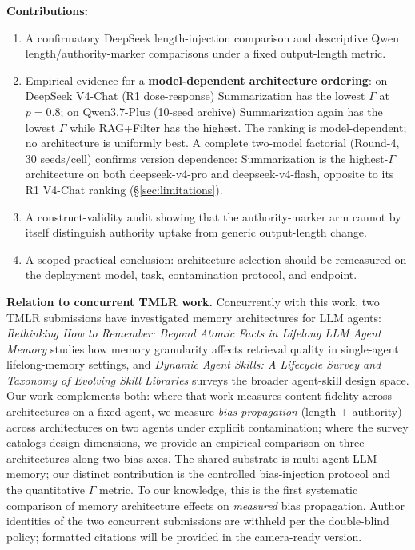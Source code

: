 \documentclass[11pt]{article}
\begin{document}
\textbf{Contributions:}
\begin{enumerate}[nosep]
    \item A confirmatory DeepSeek length-injection comparison and descriptive Qwen length/authority-marker comparisons under a fixed output-length metric.
    \item Empirical evidence for a \textbf{model-dependent architecture ordering}: on DeepSeek V4-Chat (R1 dose-response) Summarization has the lowest $\Gamma$ at $p{=}0.8$; on Qwen3.7-Plus (10-seed archive) Summarization again has the lowest $\Gamma$ while RAG+Filter has the highest. The ranking is model-dependent; no architecture is uniformly best. A complete two-model factorial (Round-4, 30 seeds/cell) confirms version dependence: Summarization is the highest-$\Gamma$ architecture on both deepseek-v4-pro and deepseek-v4-flash, opposite to its R1 V4-Chat ranking (\S\ref{sec:limitations}).
    \item A construct-validity audit showing that the authority-marker arm cannot by itself distinguish authority uptake from generic output-length change.
    \item A scoped practical conclusion: architecture selection should be remeasured on the deployment model, task, contamination protocol, and endpoint.
\end{enumerate}

\noindent\textbf{Relation to concurrent TMLR work.}
Concurrently with this work, two TMLR submissions have investigated memory architectures for LLM agents: \textit{Rethinking How to Remember: Beyond Atomic Facts in Lifelong LLM Agent Memory} studies how memory granularity affects retrieval quality in single-agent lifelong-memory settings, and \textit{Dynamic Agent Skills: A Lifecycle Survey and Taxonomy of Evolving Skill Libraries} surveys the broader agent-skill design space. Our work complements both: where that work measures content fidelity across architectures on a fixed agent, we measure \emph{bias propagation} (length + authority) across architectures on two agents under explicit contamination; where the survey catalogs design dimensions, we provide an empirical comparison on three architectures along two bias axes. The shared substrate is multi-agent LLM memory; our distinct contribution is the controlled bias-injection protocol and the quantitative $\Gamma$ metric. To our knowledge, this is the first systematic comparison of memory architecture effects on \emph{measured} bias propagation. Author identities of the two concurrent submissions are withheld per the double-blind policy; formatted citations will be provided in the camera-ready version.
\end{document}
